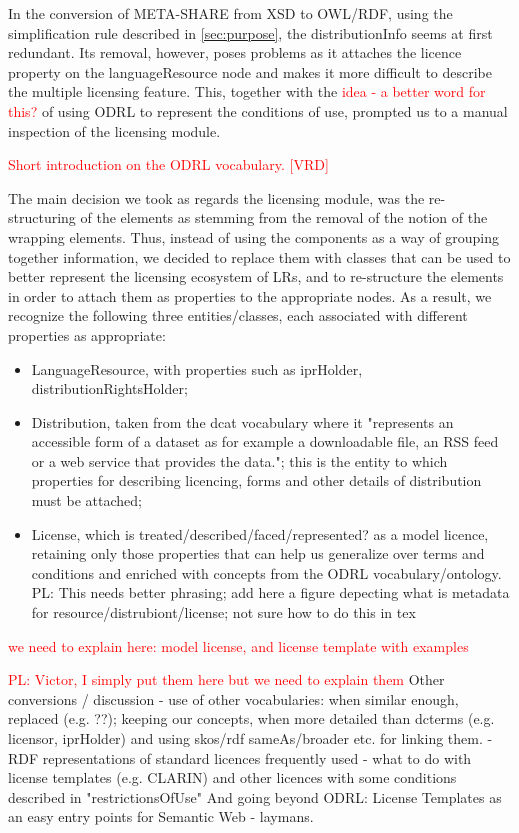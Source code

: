 \documentclass{llncs}
\begin{document}
{In the conversion of META-SHARE from XSD to OWL/RDF, using the simplification rule described in \ref{sec:purpose}, the distributionInfo seems at first redundant. Its removal, however, poses problems as it attaches the licence property on the languageResource node and makes it more difficult to describe the multiple licensing feature. This, together with the \textcolor{red}{idea - a better word for this?} of using ODRL to represent the conditions of use, prompted us to a manual inspection of the licensing module.

\textcolor{red}{Short introduction on the ODRL vocabulary. [VRD]}

The main decision we took as regards the licensing module, was the re-structuring of the elements as stemming from the removal of the notion of the wrapping elements. Thus, instead of using the components as a way of grouping together information, we decided to replace them with classes that can be used to better represent the licensing ecosystem of LRs, and to re-structure the elements in order to attach them as properties to the appropriate nodes. As a result, we recognize the following three entities/classes, each associated with different properties as appropriate:
\begin{itemize}
\item LanguageResource, with properties such as iprHolder, distributionRightsHolder;
\item Distribution, taken from the dcat vocabulary where it "represents an accessible form of a dataset as for example a downloadable file, an RSS feed or a web service that provides the data."; this is the entity to which properties for describing licencing, forms and other details of distribution must be attached;
\item License, which is treated/described/faced/represented? as a model licence, retaining only those properties that can help us generalize over terms and conditions and enriched with concepts from the ODRL vocabulary/ontology. 
{PL: This needs better phrasing; add here a figure depecting what is metadata for resource/distrubiont/license; not sure how to do this in tex}
\end{itemize}
\textcolor{red}{we need to explain here: model license, and license template with examples} 

\textcolor{red}{PL: Victor, I simply put them here but we need to explain them}
Other conversions / discussion
- use of other vocabularies: when similar enough, replaced (e.g. ??); keeping our concepts, when more detailed than dcterms (e.g. licensor, iprHolder) and using skos/rdf sameAs/broader etc. for linking them.
- RDF representations of standard licences frequently used 
- what to do with license templates (e.g. CLARIN) and other licences with some conditions described in "restrictionsOfUse"
And going beyond ODRL: License Templates as an easy entry points for Semantic Web - laymans.
}
\end{document}
